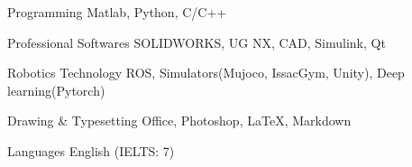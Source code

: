\vspace{-3.0mm}
\vspace{-3.0mm}
\begin{cvskills}
\cvskill
   {Programming} %
    {Matlab, Python, C/C++} %

  \cvskill
   {Professional Softwares} %
   {SOLIDWORKS, UG NX, CAD, Simulink, Qt} %

  \cvskill
   {Robotics Technology} %
   {ROS, Simulators(Mujoco, IssacGym, Unity), Deep learning(Pytorch)} %
   
  \cvskill
{Drawing \& Typesetting} %
{Office, Photoshop, \textrm{\LaTeX}, Markdown} %

  \cvskill
   {Languages} %
   {English (IELTS: 7)} %
 \vspace{-9.0mm}  
\end{cvskills}
